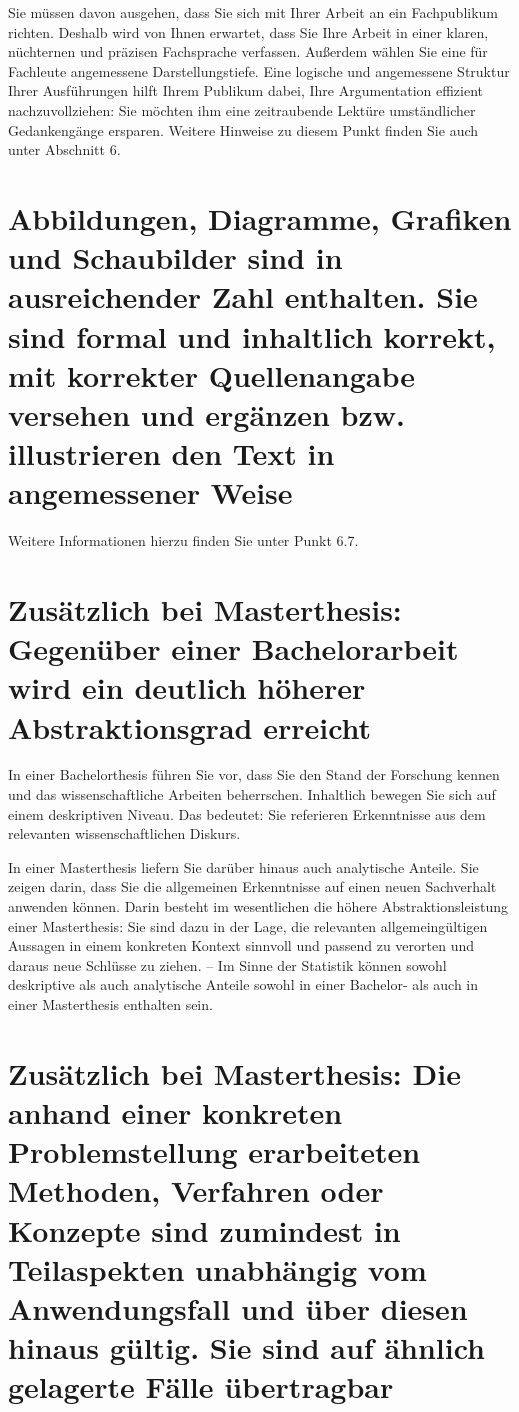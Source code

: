 Sie müssen davon ausgehen, dass Sie sich mit Ihrer Arbeit an ein Fachpublikum richten. Deshalb wird von Ihnen erwartet, dass Sie Ihre Arbeit in einer klaren, nüchternen und präzisen Fachsprache verfassen. Außerdem wählen Sie eine für Fachleute angemessene Darstellungstiefe. Eine logische und angemessene Struktur Ihrer Ausführungen hilft Ihrem Publikum dabei, Ihre Argumentation effizient nachzuvollziehen: Sie möchten ihm eine zeitraubende Lektüre umständlicher Gedankengänge ersparen. Weitere Hinweise zu diesem Punkt finden Sie auch unter Abschnitt 6.

\section{Abbildungen, Diagramme, Grafiken und Schaubilder sind in ausreichender Zahl enthalten. Sie sind formal und inhaltlich korrekt, mit korrekter Quellenangabe versehen und ergänzen bzw. illustrieren den Text in angemessener Weise}
\label{sec:abbildungen}

Weitere Informationen hierzu finden Sie unter Punkt 6.7.

\section{Zusätzlich bei Masterthesis: Gegenüber einer Bachelorarbeit wird ein deutlich höherer Abstraktionsgrad erreicht}
\label{sec:masterthesis-abstraktionsgrad}

In einer Bachelorthesis führen Sie vor, dass Sie den Stand der Forschung kennen und das wissenschaftliche Arbeiten beherrschen. Inhaltlich bewegen Sie sich auf einem deskriptiven Niveau. Das bedeutet: Sie referieren Erkenntnisse aus dem relevanten wissenschaftlichen Diskurs.

In einer Masterthesis liefern Sie darüber hinaus auch analytische Anteile. Sie zeigen darin, dass Sie die allgemeinen Erkenntnisse auf einen neuen Sachverhalt anwenden können. Darin besteht im wesentlichen die höhere Abstraktionsleistung einer Masterthesis: Sie sind dazu in der Lage, die relevanten allgemeingültigen Aussagen in einem konkreten Kontext sinnvoll und passend zu verorten und daraus neue Schlüsse zu ziehen. – Im Sinne der Statistik können sowohl deskriptive als auch analytische Anteile sowohl in einer Bachelor- als auch in einer Masterthesis enthalten sein.

\section{Zusätzlich bei Masterthesis: Die anhand einer konkreten Problemstellung erarbeiteten Methoden, Verfahren oder Konzepte sind zumindest in Teilaspekten unabhängig vom Anwendungsfall und über diesen hinaus gültig. Sie sind auf ähnlich gelagerte Fälle übertragbar}
\label{sec:masterthesis-uebertragbarkeit}

